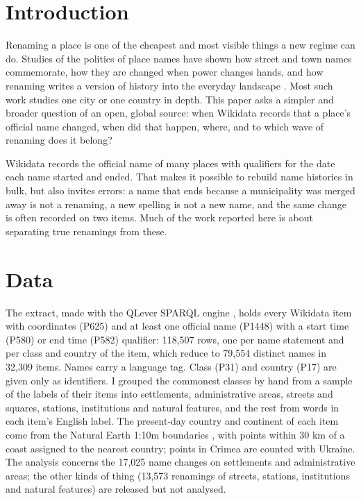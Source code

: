 \documentclass[11pt,a4paper]{article}
\begin{document}
\section{Introduction}
Renaming a place is one of the cheapest and most visible things a new regime can do. Studies of the politics of place names have shown how street and town names commemorate, how they are changed when power changes hands, and how renaming writes a version of history into the everyday landscape \citep{azaryahu1996,roseredwood2010,light2004}. Most such work studies one city or one country in depth. This paper asks a simpler and broader question of an open, global source: when Wikidata records that a place's official name changed, when did that happen, where, and to which wave of renaming does it belong?

Wikidata \citep{wikidata} records the official name of many places with qualifiers for the date each name started and ended. That makes it possible to rebuild name histories in bulk, but also invites errors: a name that ends because a municipality was merged away is not a renaming, a new spelling is not a new name, and the same change is often recorded on two items. Much of the work reported here is about separating true renamings from these.

\section{Data}
The extract, made with the QLever SPARQL engine \citep{qlever}, holds every Wikidata item with coordinates (P625) and at least one official name (P1448) with a start time (P580) or end time (P582) qualifier: 118,507 rows, one per name statement and per class and country of the item, which reduce to 79,554 distinct names in 32,309 items. Names carry a language tag. Class (P31) and country (P17) are given only as identifiers. I grouped the commonest classes by hand from a sample of the labels of their items into settlements, administrative areas, streets and squares, stations, institutions and natural features, and the rest from words in each item's English label. The present-day country and continent of each item come from the Natural Earth 1:10m boundaries \citep{naturalearth}, with points within 30 km of a coast assigned to the nearest country; points in Crimea are counted with Ukraine. The analysis concerns the 17,025 name changes on settlements and administrative areas; the other kinds of thing (13,573 renamings of streets, stations, institutions and natural features) are released but not analysed.
\end{document}
